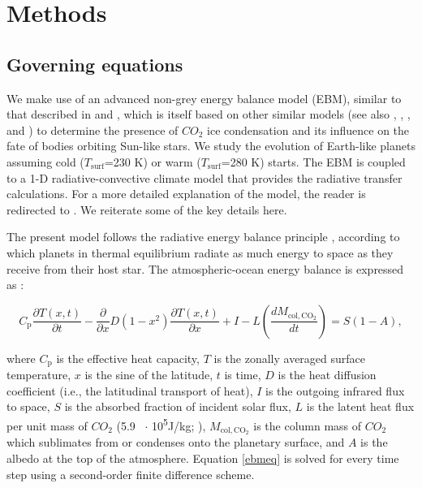 \documentclass[fleqn,usenatbib]{mnras}
\providecommand{\DIFdelbegin}{} %
\providecommand{\DIFdelend}{} %
\newcommand{\DIFscaledelfig}{0.5}
\newlength{\DIFdelgraphicswidth} %
\newlength{\DIFdelgraphicsheight} %
\newcommand{\DIFdelincludegraphics}[2][]{%
\sbox{\DIFdelgraphicsbox}{\DIFOincludegraphics[#1]{#2}}%
\settoboxwidth{\DIFdelgraphicswidth}{\DIFdelgraphicsbox} %
\settoboxtotalheight{\DIFdelgraphicsheight}{\DIFdelgraphicsbox} %
\scalebox{\DIFscaledelfig}{%
\parbox[b]{\DIFdelgraphicswidth}{\usebox{\DIFdelgraphicsbox}\\[-\baselineskip] \rule{\DIFdelgraphicswidth}{0em}}\llap{\resizebox{\DIFdelgraphicswidth}{\DIFdelgraphicsheight}{%
\setlength{\unitlength}{\DIFdelgraphicswidth}%
\begin{picture}(1,1)%
\thicklines\linethickness{2pt} %
{\color[rgb]{1,0,0}\put(0,0){\framebox(1,1){}}}%
{\color[rgb]{1,0,0}\put(0,0){\line( 1,1){1}}}%
{\color[rgb]{1,0,0}\put(0,1){\line(1,-1){1}}}%
\end{picture}%
}\hspace*{3pt}}} %
} %
\DeclareRobustCommand{\DIFdelbegin}{\DIFOdelbegin \let\includegraphics\DIFdelincludegraphics} %
\DeclareRobustCommand{\DIFdelend}{\DIFOaddend \let\includegraphics\DIFOincludegraphics} %
\begin{document}
\section{Methods}
\label{sec:Methods}
\subsection{Governing equations}
We make use of an advanced non-grey energy balance model (EBM), similar to that described in \citet{RamirezLevi2018} and \cite{ramirez2020}, which is itself based on  other similar models (see also \citet{North1979},  \citet{North1981}, \citet{Williams1997}, and \citet{vladilo2013}) to determine the presence of $CO_{\mathrm{2}}$ ice condensation and its influence on the fate of bodies orbiting Sun-like stars. We study the evolution of Earth-like planets assuming cold ($T_{\mathrm{surf}}$=230 K) or warm ($T_{\mathrm{surf}}$=280 K) starts. The EBM is coupled to a 1-D radiative-convective climate model that provides the radiative transfer calculations. For a more detailed explanation of the model, the reader is redirected to \citet{ramirez2020}. We reiterate some of the key details here.

The present model follows the radiative energy balance principle \citep[e.g.,][]{Williams1997}, according to which planets in thermal equilibrium radiate as much energy to space as they receive from their host star. The atmospheric-ocean energy balance is expressed as \citep[e.g.,][]{james1982,Williams1997,batalha2016}: 

\begin{equation}
\label{ebmeq}
    C_{\mathrm{p}} \frac{\partial T(x, t)}{\partial t}-\frac{\partial}{\partial x} D\left(1-x^{2}\right) \frac{\partial T(x, t)}{\partial x}+I-L\left (\frac{dM_{\mathrm{col,CO_{\mathrm{2}}}}}{dt}\right )=S(1-A),
\end{equation}{}
\DIFdelbegin %

\DIFdelend where $C_{\mathrm{p}}$ is the effective heat capacity, $T$ is the zonally averaged surface temperature, $x$ is the sine of the latitude, $t$ is time, $D$ is the heat diffusion coefficient (i.e., the latitudinal transport of heat), $I$ is the outgoing infrared flux to space, $S$ is the absorbed fraction of incident solar flux, $L$ is the latent heat flux per unit mass of $CO_{\mathrm{2}}$ (5.9 \ $\cdot$ 10\textsuperscript{5}J/kg; \citet{forget1998}), $M_{\mathrm{col,CO_{\mathrm{2}}}}$ is the column mass of $CO_{\mathrm{2}}$ which sublimates from or condenses onto the planetary surface, and $A$ is the albedo at the top of the atmosphere. Equation \ref{ebmeq} is solved for every time step using a second-order finite difference scheme.
\end{document}

